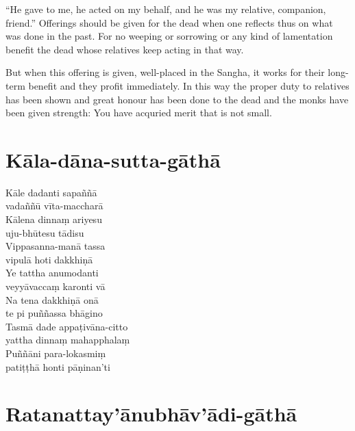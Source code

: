 
\begin{english}
  ``He gave to me, he acted on my behalf, and he was my relative, companion,
  friend.'' Offerings should be given for the dead when one reflects thus on
  what was done in the past. For no weeping or sorrowing or any kind of
  lamentation benefit the dead whose relatives keep acting in that way.

  \bigskip

  But when this offering is given, well-placed in the Sangha, it works for their
  long-term benefit and they profit immediately. In this way the proper duty to
  relatives has been shown and great honour has been done to the dead and the
  monks have been given strength: You have acquried merit that is not small.
\end{english}


\section{Kāla-dāna-sutta-gāthā}


\begin{paritta}
  Kāle dadanti sapaññā\\\vin vadaññū vīta-maccharā\\
  Kālena dinnaṃ ariyesu\\\vin uju-bhūtesu tādisu\\
  Vippasanna-manā tassa\\\vin vipulā hoti dakkhiṇā\\
  Ye tattha anumodanti\\\vin veyyāvaccaṃ karonti vā\\
  Na tena dakkhiṇā onā\\\vin te pi puññassa bhāgino\\
  Tasmā dade appaṭivāna-citto\\\vin yattha dinnaṃ mahapphalaṃ\\
  Puññāni para-lokasmiṃ\\\vin patiṭṭhā honti pāṇinan'ti 
\end{paritta}

\section{Ratanattay'ānubhāv'ādi-gāthā}

